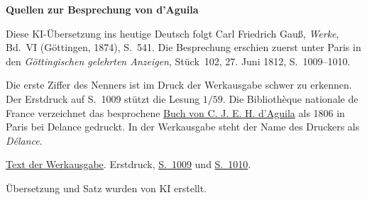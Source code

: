 \clearpage\thispagestyle{empty}
\begin{center}\textbf{Quellen zur Besprechung von d’Aguila}\end{center}
\noindent Diese KI-Übersetzung ins heutige Deutsch folgt Carl Friedrich Gauß, \textit{Werke}, Bd.~VI (Göttingen, 1874), S.~541. Die Besprechung erschien zuerst unter Paris in den \textit{Göttingischen gelehrten Anzeigen}, Stück~102, 27. Juni 1812, S.~1009--1010.
\par\smallskip\noindent Die erste Ziffer des Nenners ist im Druck der Werkausgabe schwer zu erkennen. Der Erstdruck auf S.~1009 stützt die Lesung \(1/59\). Die Bibliothèque nationale de France verzeichnet das besprochene \href{https://catalogue.bnf.fr/ark:/12148/cb30005371x}{Buch von C. J. E. H. d’Aguila} als 1806 in Paris bei Delance gedruckt. In der Werkausgabe steht der Name des Druckers als \textit{Délance}.
\par\smallskip\noindent \href{https://gdz.sub.uni-goettingen.de/id/PPN236007467}{Text der Werkausgabe}. Erstdruck, \href{https://images.sub.uni-goettingen.de/iiif/image/gdz:PPN319721507_1812:00001049/full/full/0/default.jpg}{S.~1009} und \href{https://images.sub.uni-goettingen.de/iiif/image/gdz:PPN319721507_1812:00001050/full/full/0/default.jpg}{S.~1010}.
\par\smallskip\noindent Übersetzung und Satz wurden von KI erstellt.
\clearpage
